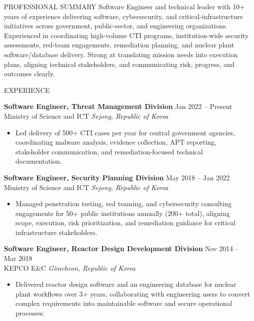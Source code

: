 \documentclass{resume}
\begin{document}
\small

\begin{rSection}{PROFESSIONAL SUMMARY}
Software Engineer and technical leader with 10+ years of experience delivering software, cybersecurity, and critical-infrastructure initiatives across government, public-sector, and engineering organizations. Experienced in coordinating high-volume CTI programs, institution-wide security assessments, red-team engagements, remediation planning, and nuclear plant software/database delivery. Strong at translating mission needs into execution plans, aligning technical stakeholders, and communicating risk, progress, and outcomes clearly.
\end{rSection}

\begin{rSection}{EXPERIENCE}

\textbf{Software Engineer, Threat Management Division} \hfill Jan 2022 -- Present\\
Ministry of Science and ICT \hfill \textit{Sejong, Republic of Korea}
\begin{itemize}
    \itemsep -4pt {}
    \item Led delivery of 500+ CTI cases per year for central government agencies, coordinating malware analysis, evidence collection, APT reporting, stakeholder communication, and remediation-focused technical documentation.
\end{itemize}

\textbf{Software Engineer, Security Planning Division} \hfill May 2018 -- Jan 2022\\
Ministry of Science and ICT \hfill \textit{Sejong, Republic of Korea}
\begin{itemize}
    \itemsep -4pt {}
    \item Managed penetration testing, red teaming, and cybersecurity consulting engagements for 50+ public institutions annually (200+ total), aligning scope, execution, risk prioritization, and remediation guidance for critical infrastructure stakeholders.
\end{itemize}

\textbf{Software Engineer, Reactor Design Development Division} \hfill Nov 2014 -- Mar 2018\\
KEPCO E\&C \hfill \textit{Gimcheon, Republic of Korea}
\begin{itemize}
    \itemsep -4pt {}
    \item Delivered reactor design software and an engineering database for nuclear plant workflows over 3+ years, collaborating with engineering users to convert complex requirements into maintainable software and secure operational processes.
\end{itemize}

\end{rSection}
\end{document}

